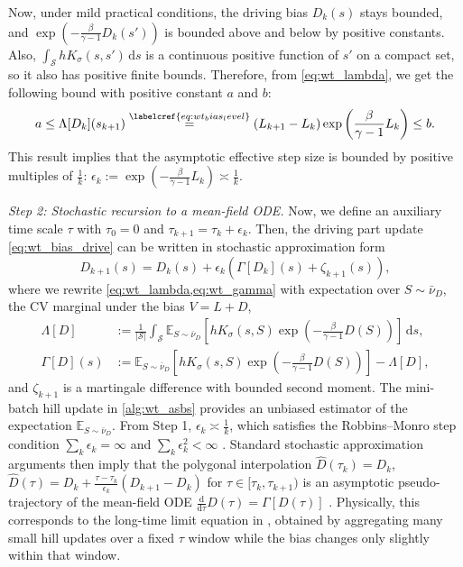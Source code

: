 \documentclass[]{fairmeta}
\theoremstyle{remark}
\begin{document}
Now, under mild practical conditions, the driving bias $D_k(s)$ stays bounded, and $\exp(-\frac{\beta}{\gamma - 1}D_k(s'))$ is bounded above and below by positive constants.
Also, $\int_\mathcal{S} hK_\sigma (s, s') \, \mathrm{d}s$ is a continuous positive function of $s'$ on a compact set, so it also has positive finite bounds.
Therefore, from \cref{eq:wt_lambda}, we get the following bound with positive constant $a$ and $b$:
\begin{equation}
a \le \Lambda[D_k](s_{k+1}) \stackrel{\labelcref{eq:wt_bias_level}}{=} (L_{k+1} - L_k) \exp\left(\frac{\beta}{\gamma - 1}L_k\right) \le b.
\end{equation}
This result implies that the asymptotic effective step size is bounded by positive multiples of $\frac{1}{k}$: $\epsilon_k := \exp(-\frac{\beta}{\gamma - 1} L_k) \asymp \frac{1}{k}$.

\textit{Step 2: Stochastic recursion to a mean-field ODE.}
Now, we define an auxiliary time scale $\tau$ with $\tau_0 = 0$ and $\tau_{k+1} = \tau_k + \epsilon_k$.
Then, the driving part update \cref{eq:wt_bias_drive} can be written in stochastic approximation form
\begin{equation}
D_{k+1}(s) = D_k(s) + \epsilon_k(\Gamma[D_k](s) + \zeta_{k+1}(s)), \label{eq:wt_rm_bias_drive}
\end{equation}
where we rewrite \cref{eq:wt_lambda,eq:wt_gamma} with expectation over $S \sim \bar{\nu}_D$, the CV marginal under the bias $V = L + D$, 
\begin{align}
\Lambda[D] & := \frac{1}{|\mathcal{S}|} \int_\mathcal{S} \mathbb{E}_{S \sim \bar{\nu}_{D}} \left[ h K_\sigma(s, S) \exp\left(-\frac{\beta}{\gamma - 1}D(S)\right) \right] \, \mathrm{d}s, \label{eq:wt_bias_level_exp} \\
\Gamma[D](s) & := \mathbb{E}_{S \sim \bar{\nu}_{D}} \left[ h K_\sigma(s, S) \exp\left(-\frac{\beta}{\gamma - 1}D(S)\right) \right] - \Lambda[D], \label{eq:wt_bias_drive_exp}
\end{align}
and $\zeta_{k+1}$ is a martingale difference with bounded second moment.
The mini-batch hill update in \cref{alg:wt_asbs} provides an unbiased estimator of the expectation $\mathbb{E}_{S \sim \bar{\nu}_D}$.
From Step 1, $\epsilon_k \asymp \frac{1}{k}$, which satisfies the Robbins--Monro step condition $\sum_k \epsilon_k = \infty$ and $\sum_k \epsilon_k^2 < \infty$ \citep{robbins1951stochastic}.
Standard stochastic approximation arguments then imply that the polygonal interpolation $\hat{D}(\tau_k) = D_k$, $\hat{D}(\tau) = D_k + \frac{\tau - \tau_k}{\epsilon_k}(D_{k+1} - D_k)$ for $\tau \in [\tau_k, \tau_{k+1})$ is an asymptotic pseudo-trajectory of the mean-field ODE $\frac{\mathrm{d}}{\mathrm{d}\tau} D(\tau) = \Gamma[D(\tau)]$ \citep{kushner2003stochastic}.
Physically, this corresponds to the long-time limit equation in \citet{dama2014well}, obtained by aggregating many small hill updates over a fixed $\tau$ window while the bias changes only slightly within that window.
\end{document}
